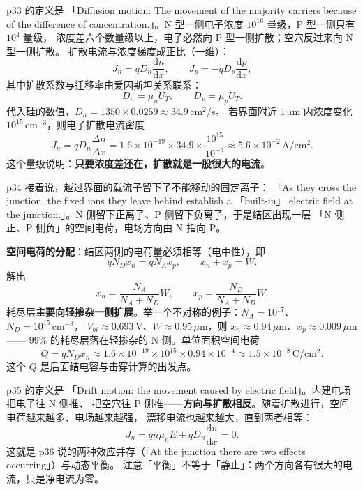 \documentclass[11pt]{ctexart}
\begin{document}
p33 的定义是 「Diffusion motion: The movement of the majority carriers because of the
difference of concentration.」。N 型一侧电子浓度 $10^{16}$ 量级，P 型一侧只有 $10^{4}$ 量级，
浓度差六个数量级以上，电子必然向 P 型一侧扩散；空穴反过来向 N 型一侧扩散。
扩散电流与浓度梯度成正比（一维）：
\[
J_n=qD_n\frac{\mathrm{d}n}{\mathrm{d}x},\qquad J_p=-qD_p\frac{\mathrm{d}p}{\mathrm{d}x},
\]
其中扩散系数与迁移率由爱因斯坦关系联系：
\[
D_n=\mu_nU_T,\qquad D_p=\mu_pU_T .
\]
代入硅的数值，$D_n=1350\times0.0259\approx34.9\,\mathrm{cm^2/s}$。
若界面附近 $1\,\mathrm{\mu m}$ 内浓度变化 $10^{15}\,\mathrm{cm^{-3}}$，则电子扩散电流密度
\[
J_n=qD_n\frac{\Delta n}{\Delta x}
=1.6\times10^{-19}\times34.9\times\frac{10^{15}}{10^{-4}}
\approx5.6\times10^{-2}\,\mathrm{A/cm^2}.
\]
这个量级说明：\textbf{只要浓度差还在，扩散就是一股很大的电流}。

p34 接着说，越过界面的载流子留下了不能移动的固定离子：
「As they cross the junction, the fixed ions they leave behind establish a 「built-in」 electric
field at the junction.」。N 侧留下正离子、P 侧留下负离子，于是结区出现一层
「N 侧正、P 侧负」的空间电荷，电场方向由 N 指向 P。

\textbf{空间电荷的分配}：结区两侧的电荷量必须相等（电中性），即
\[
qN_D x_n=qN_A x_p,\qquad x_n+x_p=W .
\]
解出
\[
x_n=\frac{N_A}{N_A+N_D}W,\qquad x_p=\frac{N_D}{N_A+N_D}W .
\]
耗尽层\textbf{主要向轻掺杂一侧扩展}。举一个不对称的例子：$N_A=10^{17}$、$N_D=10^{15}\,\mathrm{cm^{-3}}$，
$V_{bi}\approx0.693\,\mathrm{V}$、$W\approx0.95\,\mu\mathrm{m}$，则 $x_n\approx0.94\,\mu\mathrm{m}$、$x_p\approx0.009\,\mu\mathrm{m}$——
99\% 的耗尽层落在轻掺杂的 N 侧。单位面积空间电荷
\[
Q=qN_D x_n\approx1.6\times10^{-19}\times10^{15}\times0.94\times10^{-4}
\approx1.5\times10^{-8}\,\mathrm{C/cm^2}.
\]
这个 $Q$ 是后面结电容与击穿计算的出发点。


p35 的定义是 「Drift motion: the movement caused by electric field」。内建电场把电子往 N 侧推、
把空穴往 P 侧推——\textbf{方向与扩散相反}。随着扩散进行，空间电荷越来越多、电场越来越强，
漂移电流也越来越大，直到两者相等：
\[
J_n=q n\mu_n E+qD_n\frac{\mathrm{d}n}{\mathrm{d}x}=0 .
\]
这就是 p36 说的两种效应并存（「At the junction there are two effects occurring」）与动态平衡。
注意「平衡」不等于「静止」：两个方向各有很大的电流，只是净电流为零。
\end{document}
